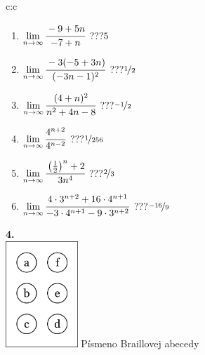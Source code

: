 \documentclass[10pt]{report}
\begin{document}
\begin{tabular}{c:c}
\begin{minipage}[c][104.5mm][t]{0.5\linewidth}
\begin{center}
\begin{minipage}{0.79\linewidth}
\begin{center}
\begin{varwidth}{\linewidth}
\begin{enumerate}
\normalsize
\item $\lim\limits_{n\to\infty}\cfrac{-9+5n}{-7+n}$\quad \dotfill\; ???\;\dotfill \quad $5$
\item $\lim\limits_{n\to\infty}\cfrac{-3(-5+3n)}{(-3n-1)^2}$\quad \dotfill\; ???\;\dotfill \quad $\nicefrac{1}{2}$
\item $\lim\limits_{n\to\infty}\cfrac{(4+n)^2}{n^2+4n-8}$\quad \dotfill\; ???\;\dotfill \quad $\nicefrac{-1}{2}$
\item $\lim\limits_{n\to\infty}\cfrac{4^{n+2}}{4^{n-2}}$\quad \dotfill\; ???\;\dotfill \quad $\nicefrac{1}{256}$
\item $\lim\limits_{n\to\infty}\cfrac{\left(\frac{1}{2}\right)^n +2}{3n^{4}}$\quad \dotfill\; ???\;\dotfill \quad $\nicefrac{2}{3}$
\item $\lim\limits_{n\to\infty}\cfrac{4\cdot 3^{n+2}+16\cdot 4^{n+1}}{-3\cdot 4^{n+1}-9\cdot 3^{n+2}}$\quad \dotfill\; ???\;\dotfill \quad $\nicefrac{-16}{9}$
\end{enumerate}
\end{varwidth}
\end{center}
\end{minipage}
\begin{minipage}{0.20\linewidth}
\begin{center}
{\Huge\bfseries 4.} \\[2mm]
\includegraphics[height=40mm]{../images/braille.png}
{\small Písmeno Braillovej abecedy}
\end{center}
\end{minipage}
\end{center}
\end{minipage}
%
\end{tabular}
\newpage
\thispagestyle{empty}
\end{document}
